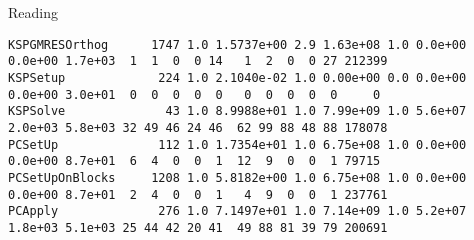\begin{frame}[fragile]{Reading }
\begin{Verbatim}[formatcom=\tiny]
KSPGMRESOrthog      1747 1.0 1.5737e+00 2.9 1.63e+08 1.0 0.0e+00 0.0e+00 1.7e+03  1  1  0  0 14   1  2  0  0 27 212399
KSPSetup             224 1.0 2.1040e-02 1.0 0.00e+00 0.0 0.0e+00 0.0e+00 3.0e+01  0  0  0  0  0   0  0  0  0  0     0
KSPSolve              43 1.0 8.9988e+01 1.0 7.99e+09 1.0 5.6e+07 2.0e+03 5.8e+03 32 49 46 24 46  62 99 88 48 88 178078
PCSetUp              112 1.0 1.7354e+01 1.0 6.75e+08 1.0 0.0e+00 0.0e+00 8.7e+01  6  4  0  0  1  12  9  0  0  1 79715
PCSetUpOnBlocks     1208 1.0 5.8182e+00 1.0 6.75e+08 1.0 0.0e+00 0.0e+00 8.7e+01  2  4  0  0  1   4  9  0  0  1 237761
PCApply              276 1.0 7.1497e+01 1.0 7.14e+09 1.0 5.2e+07 1.8e+03 5.1e+03 25 44 42 20 41  49 88 81 39 79 200691
\end{Verbatim}
\end{frame}
